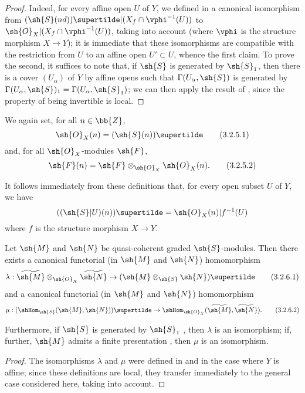\begin{proof}
Indeed, for every affine open $U$ of $Y$, we defined in  a canonical isomorphism from $(\sh{S}(nd))\supertilde|(X_f\cap\vphi^{-1}(U))$ to $\sh{O}_X|(X_f\cap\vphi^{-1}(U))$, taking  into account (where $\vphi$ is the structure morphism $X\to Y$);
it is immediate that these isomorphisms are compatible with the restriction from $U$ to an affine open $U'\subset U$, whence the first claim.
To prove the second, it suffices to note that, if $\sh{S}$ is generated by $\sh{S}_1$, then there is a cover $(U_\alpha)$ of $Y$ by affine opens such that $\Gamma(U_\alpha,\sh{S})$ is generated by $\Gamma(U_\alpha,\sh{S})_1=\Gamma(U_\alpha,\sh{S}_1)$;
we can then apply the result of , since the property of being invertible is local.
\end{proof}

We again set, for all $n\in\bb{Z}$,
\[
\label{II.3.2.5.1}
  \sh{O}_X(n) = (\sh{S}(n))\supertilde
\tag{3.2.5.1}
\]
and, for all $\sh{O}_X$-modules $\sh{F}$,
\[
\label{II.3.2.5.2}
  \sh{F}(n) = \sh{F}\otimes_{\sh{O}_X}\sh{O}_X(n).
\tag{3.2.5.2}
\]

It follows immediately from these definitions that, for every open subset $U$ of $Y$, we have
\[
  ((\sh{S}|U)(n))\supertilde = \sh{O}_X(n)|f^{-1}(U)
\]
where $f$ is the structure morphism $X\to Y$.

\begin{proposition}[3.2.6]
\label{II.3.2.6}
Let $\sh{M}$ and $\sh{N}$ be quasi-coherent graded $\sh{S}$-modules.
Then there exists a canonical functorial (in $\sh{M}$ and $\sh{N}$) homomorphism
\[
\label{II.3.2.6.1}
  \lambda : \widetilde{\sh{M}}\otimes_{\sh{O}_X}\widetilde{\sh{N}} \to (\sh{M}\otimes_{\sh{S}}\sh{N})\supertilde
\tag{3.2.6.1}
\]
and a canonical functorial (in $\sh{M}$ and $\sh{N}$) homomorphism
\[
\label{II.3.2.6.2}
  \mu : (\shHom_{\sh{S}}(\sh{M},\sh{N}))\supertilde \to \shHom_{\sh{O}_X}(\widetilde{\sh{M}},\widetilde{\sh{N}}).
\tag{3.2.6.2}
\]

Furthermore, if $\sh{S}$ is generated by $\sh{S}_1$ , then $\lambda$ is an isomorphism;
if, further, $\sh{M}$ admits a finite presentation , then $\mu$ is an isomorphism.
\end{proposition}

\begin{proof}
The isomorphisms $\lambda$ and $\mu$ were defined in  and  in the case where $Y$ is affine;
since these definitions are local, they transfer immediately to the general case considered here, taking  into account.
\end{proof}

